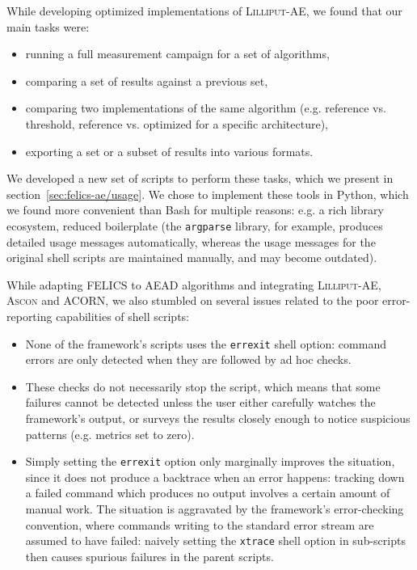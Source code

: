 \documentclass{article}
\begin{document}
While developing optimized implementations of \textsc{Lilliput-AE}, we
found that our main tasks were:

\begin{itemize}
\item running a full measurement campaign for a set of algorithms,
\item comparing a set of results against a previous set,
\item comparing two implementations of the same algorithm
  (e.g. reference vs. threshold, reference vs. optimized for a
  specific architecture),
\item exporting a set or a subset of results into various formats.
\end{itemize}

We developed a new set of scripts to perform these tasks, which we
present in section~\ref{sec:felics-ae/usage}.  We chose to implement
these tools in Python, which we found more convenient than Bash for
multiple reasons: e.g. a rich library ecosystem, reduced boilerplate
(the \texttt{argparse} library, for example, produces detailed usage
messages automatically, whereas the usage messages for the original
shell scripts are maintained manually, and may become outdated).

While adapting FELICS to AEAD algorithms and integrating
\textsc{Lilliput-AE}, \textsc{Ascon} and ACORN, we also stumbled on
several issues related to the poor error-reporting capabilities of
shell scripts:

\begin{itemize}
\item None of the framework's scripts uses the \texttt{errexit} shell
  option: command errors are only detected when they are followed by
  ad hoc checks.
\item These checks do not necessarily stop the script, which means
  that some failures cannot be detected unless the user either
  carefully watches the framework's output, or surveys the results
  closely enough to notice suspicious patterns (e.g. metrics set to
  zero).
\item Simply setting the \texttt{errexit} option only marginally
  improves the situation, since it does not produce a backtrace when
  an error happens: tracking down a failed command which produces no
  output involves a certain amount of manual work.  The situation is
  aggravated by the framework's error-checking convention, where
  commands writing to the standard error stream are assumed to have
  failed: naively setting the \texttt{xtrace} shell option in
  sub-scripts then causes spurious failures in the parent scripts.
\end{itemize}
\end{document}

